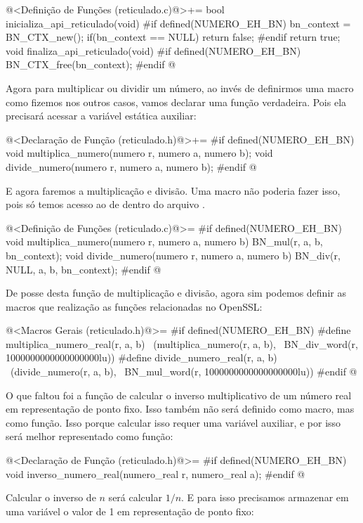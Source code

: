 \iniciocodigo
@<Definição de Funções (reticulado.c)@>+=
bool inicializa_api_reticulado(void){
#if defined(NUMERO_EH_BN)
  bn_context = BN_CTX_new();
  if(bn_context == NULL)
    return false;
#endif
  return true;
}
void finaliza_api_reticulado(void){
#if defined(NUMERO_EH_BN)
  BN_CTX_free(bn_context);
#endif
}
@
\fimcodigo

Agora para multiplicar ou dividir um número, ao invés de definirmos
uma macro como fizemos nos outros casos, vamos declarar uma função
verdadeira. Pois ela precisará acessar a variável estática auxiliar:

\iniciocodigo
@<Declaração de Função (reticulado.h)@>+=
#if defined(NUMERO_EH_BN)
void multiplica_numero(numero r, numero a, numero b);
void divide_numero(numero r, numero a, numero b);
#endif
@
\fimcodigo

E agora faremos a multiplicação e divisão. Uma macro não poderia fazer
isso, pois só temos acesso ao  de dentro do
arquivo .

\iniciocodigo
@<Definição de Funções (reticulado.c)@>=
#if defined(NUMERO_EH_BN)
void multiplica_numero(numero r, numero a, numero b){
  BN_mul(r, a, b, bn_context);
}
void divide_numero(numero r, numero a, numero b){
  BN_div(r, NULL, a, b, bn_context);
}
#endif
@

De posse desta função de multiplicação e divisão, agora sim podemos
definir as macros que realização as funções relacionadas no OpenSSL:

\iniciocodigo
@<Macros Gerais (reticulado.h)@>=
#if defined(NUMERO_EH_BN)
#define multiplica_numero_real(r, a, b)  \
        (multiplica_numero(r, a, b),    \
         BN_div_word(r, 1000000000000000000lu))
#define divide_numero_real(r, a, b)     \
        (divide_numero(r, a, b),    \
         BN_mul_word(r, 1000000000000000000lu))
#endif
@
\fimcodigo

O que faltou foi a função de calcular o inverso multiplicativo de um
número real em representação de ponto fixo. Isso também não será
definido como macro, mas como função. Isso porque calcular isso requer
uma variável auxiliar, e por isso será melhor representado como
função:

\iniciocodigo
@<Declaração de Função (reticulado.h)@>=
#if defined(NUMERO_EH_BN)
void inverso_numero_real(numero_real r, numero_real a);
#endif
@
\fimcodigo

Calcular o inverso de $n$ será calcular $1/n$. E para isso precisamos
armazenar em uma variável o valor de 1 em representação de ponto fixo:

